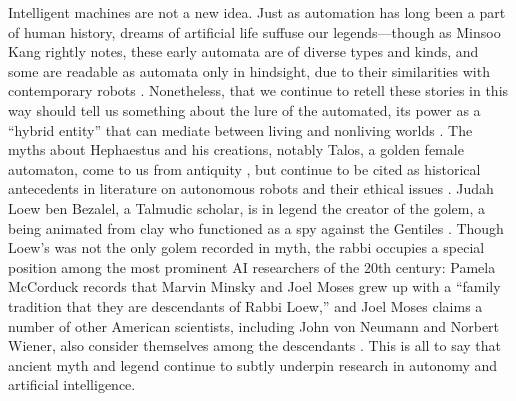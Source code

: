 Intelligent machines are not a new idea. Just as automation has long
been a part of human history, dreams of artificial life suffuse our
legends---though as Minsoo Kang
rightly notes, these early automata are of diverse types and kinds,
and some are readable as automata only in hindsight, due to their
similarities with contemporary robots \cite[p. 15]{kang}.
Nonetheless, that we continue 
to retell these stories in this way should tell us something about the
lure of the automated, its power as a ``hybrid entity'' that can
mediate between living and nonliving worlds \cite[p. 19]{kang}.
The myths about Hephaestus and 
his creations, notably Talos, a golden female automaton, come to us
from antiquity \cite[Ch. 1]{mccorduck}, but continue to be cited as
historical antecedents in 
literature on autonomous robots and their ethical issues \cite[p.
  3]{patrickLin}. Judah Loew ben Bezalel, a Talmudic
scholar, is in legend the 
creator of the golem, a being animated from clay who functioned as a
spy against the Gentiles \cite[Ch. 1]{mccorduck}. Though Loew's was not the only golem
recorded in myth, the rabbi occupies a special position among the most
prominent AI researchers of the 20th century: Pamela McCorduck records
that Marvin Minsky and Joel Moses grew up with a ``family tradition
that they are descendants of Rabbi Loew,'' and Joel Moses claims a number of
other American scientists, including John von Neumann and Norbert
Wiener, also consider themselves among the descendants \cite[Ch.
  1]{mccorduck}. This is all 
to say that ancient myth and legend continue to subtly underpin
research in autonomy and artificial intelligence.



